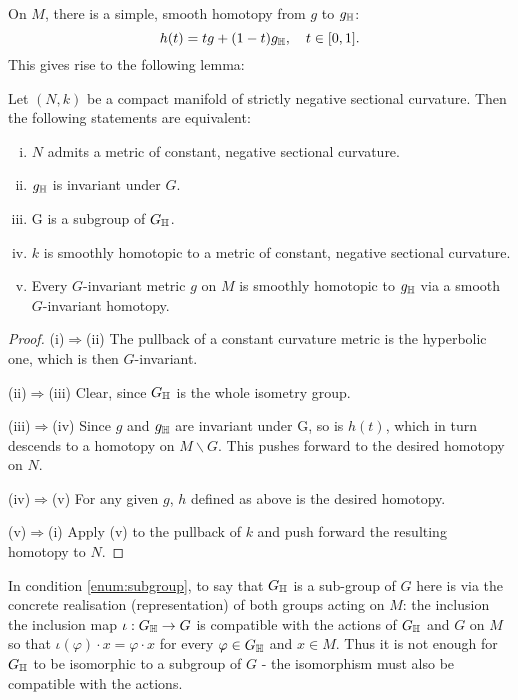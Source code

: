 \documentclass[a4paper, 12pt]{amsart}
\begin{document}
On \(M\), there is a simple, smooth homotopy from \(g\) to \(g_{\mathbb{H}}\):
\[
h(t) = tg + (1-t)g_{\mathbb{H}}, \quad t \in [0, 1].
\]
This gives rise to the following lemma:
\begin{lemma}
\label{lem:const_neg}
Let \((N, k)\) be a compact manifold of strictly negative sectional curvature. Then the following statements are equivalent:
\begin{enumerate}[(i)]
\item \label{enum:neg_met} \(N\) admits a metric of constant, negative sectional curvature.
\item \label{enum:deck_met} \(g_{\mathbb{H}}\) is invariant under \(G\).
\item \label{enum:subgroup} G is a subgroup of \(G_{\mathbb{H}}\).
\item \label{enum:homo_met} \(k\) is smoothly homotopic to a metric of constant, negative sectional curvature.
\item \label{enum:homo_deck} Every \(G\)-invariant metric \(g\) on \(M\) is smoothly homotopic to \(g_{\mathbb{H}}\) via a smooth \(G\)-invariant homotopy.
\end{enumerate}
\end{lemma}
\begin{proof}

(i)\(\Rightarrow\)(ii)
The pullback of a constant curvature metric is the hyperbolic one, which is then \(G\)-invariant.

(ii)\(\Rightarrow\)(iii)
Clear, since \(G_{\mathbb{H}}\) is the whole isometry group.

(iii)\(\Rightarrow\)(iv)
Since \(g\) and \(g_{\mathbb{H}}\) are invariant under G, so is \(h(t)\), which in turn descends to a homotopy on \(M\backslash G\). This pushes forward to the desired homotopy on \(N\).

(iv)\(\Rightarrow\)(v)
For any given \(g\), \(h\) defined as above is the desired homotopy.

(v)\(\Rightarrow\)(i)
Apply (v) to the pullback of \(k\) and push forward the resulting homotopy to \(N\).
\end{proof}
\begin{rem}
In condition \ref{enum:subgroup}, to say that \(G_{\mathbb{H}}\) is a sub-group of \(G\) here is via the concrete realisation (representation) of both groups acting on \(M\): the inclusion the inclusion map \(\iota : G_{\mathbb{H}} \to G\) is compatible with the actions of \(G_{\mathbb{H}}\) and \(G\) on \(M\) so that \(\iota(\varphi) \cdot x = \varphi \cdot x\) for every \(\varphi \in G_{\mathbb{H}}\) and \(x \in M\). Thus it is not enough for \(G_{\mathbb{H}}\) to be isomorphic to a subgroup of \(G\) - the isomorphism must also be compatible with the actions.
\end{rem}
\end{document}
